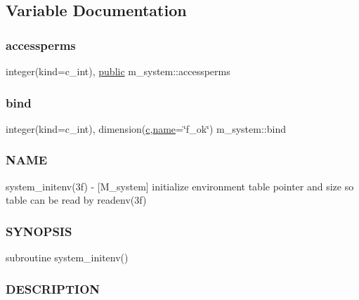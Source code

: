 \subsection{Variable Documentation}
\mbox{\label{namespacem__system_aebf870d5d43a6bd77ae469c795008109}} 
\subsubsection{\texorpdfstring{accessperms}{accessperms}}
{\footnotesize\ttfamily integer(kind=c\+\_\+int), \hyperlink{M__stopwatch_83_8txt_a2f74811300c361e53b430611a7d1769f}{public} m\+\_\+system\+::accessperms}

\mbox{\label{namespacem__system_afe662f3eb5605285a495404491087190}} 
\subsubsection{\texorpdfstring{bind}{bind}}
{\footnotesize\ttfamily integer(kind=c\+\_\+int), dimension(\hyperlink{c_8f90_aeb1f4e639be0213b4cbd07f2583a5b1f}{c},\hyperlink{M__stopwatch_83_8txt_a3f508a893ae4c3b397b4383e33b9bcae}{name}=\char`\"{}f\+\_\+ok\char`\"{}) m\+\_\+system\+::bind\hspace{0.3cm}{\ttfamily [private]}}



\subsubsection*{N\+A\+ME}

system\+\_\+initenv(3f) -\/ \mbox{[}M\+\_\+system\mbox{]} initialize environment table pointer and size so table can be read by readenv(3f) \subsubsection*{S\+Y\+N\+O\+P\+S\+IS}

subroutine system\+\_\+initenv() \subsubsection*{D\+E\+S\+C\+R\+I\+P\+T\+I\+ON}

